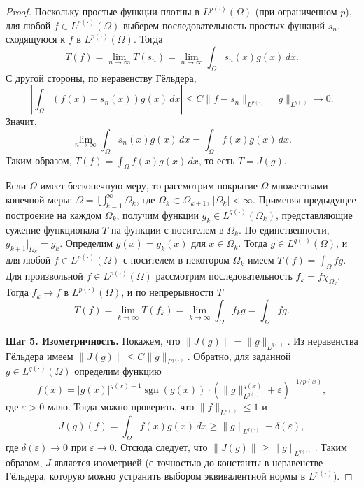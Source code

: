 \documentclass[../NDCNNAI_main.tex]{subfiles}
\begin{document}
\begin{proof}
Поскольку простые функции плотны в \( L^{p(\cdot)}(\Omega) \) (при ограниченном \( p \)), для любой \( f \in L^{p(\cdot)}(\Omega) \) выберем последовательность простых функций \( s_n \), сходящуюся к \( f \) в \( L^{p(\cdot)}(\Omega) \). Тогда
\[
T(f) = \lim_{n\to\infty} T(s_n) = \lim_{n\to\infty} \int_{\Omega} s_n(x)g(x) \, dx.
\]
С другой стороны, по неравенству Гёльдера,
\[
\left| \int_{\Omega} (f(x) - s_n(x))g(x) \, dx \right| \leq C \|f - s_n\|_{L^{p(\cdot)}} \|g\|_{L^{q(\cdot)}} \to 0.
\]
Значит,
\[
\lim_{n\to\infty} \int_{\Omega} s_n(x)g(x) \, dx = \int_{\Omega} f(x)g(x) \, dx.
\]
Таким образом, \( T(f) = \int_{\Omega} f(x)g(x) \, dx \), то есть \( T = J(g) \).

Если \( \Omega \) имеет бесконечную меру, то рассмотрим покрытие \( \Omega \) множествами конечной меры: \( \Omega = \bigcup_{k=1}^\infty \Omega_k \), где \( \Omega_k \subset \Omega_{k+1} \), \( |\Omega_k| < \infty \). Применяя предыдущее построение на каждом \( \Omega_k \), получим функции \( g_k \in L^{q(\cdot)}(\Omega_k) \), представляющие сужение функционала \( T \) на функции с носителем в \( \Omega_k \). По единственности, \( g_{k+1}\big|_{\Omega_k} = g_k \). Определим \( g(x) = g_k(x) \) для \( x \in \Omega_k \). Тогда \( g \in L^{q(\cdot)}(\Omega) \), и для любой \( f \in L^{p(\cdot)}(\Omega) \) с носителем в некотором \( \Omega_k \) имеем \( T(f) = \int_{\Omega} f g \). Для произвольной \( f \in L^{p(\cdot)}(\Omega) \) рассмотрим последовательность \( f_k = f \chi_{\Omega_k} \). Тогда \( f_k \to f \) в \( L^{p(\cdot)}(\Omega) \), и по непрерывности \( T \)
\[
T(f) = \lim_{k\to\infty} T(f_k) = \lim_{k\to\infty} \int_{\Omega} f_k g = \int_{\Omega} f g.
\]

\noindent
\textbf{Шаг 5. Изометричность.}
Покажем, что \( \|J(g)\| = \|g\|_{L^{q(\cdot)}} \). Из неравенства Гёльдера имеем \( \|J(g)\| \leq C \|g\|_{L^{q(\cdot)}} \). Обратно, для заданной \( g \in L^{q(\cdot)}(\Omega) \) определим функцию
\[
f(x) = |g(x)|^{q(x)-1} \operatorname{sgn}(g(x)) \cdot \left( \|g\|_{L^{q(\cdot)}}^{q(x)} + \varepsilon \right)^{-1/p(x)},
\]
где \( \varepsilon > 0 \) мало. Тогда можно проверить, что \( \|f\|_{L^{p(\cdot)}} \leq 1 \) и
\[
J(g)(f) = \int_{\Omega} f(x)g(x) \, dx \geq \|g\|_{L^{q(\cdot)}} - \delta(\varepsilon),
\]
где \( \delta(\varepsilon) \to 0 \) при \( \varepsilon \to 0 \). Отсюда следует, что \( \|J(g)\| \geq \|g\|_{L^{q(\cdot)}} \). Таким образом, \( J \) является изометрией (с точностью до константы в неравенстве Гёльдера, которую можно устранить выбором эквивалентной нормы в \( L^{p(\cdot)} \)).

\end{proof}
\end{document}
